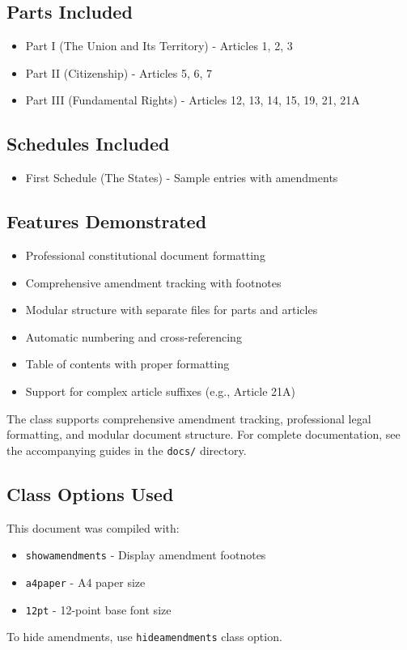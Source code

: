 \documentclass[a4paper,12pt,showamendments]{soi}
\begin{document}
\subsection*{Parts Included}
\begin{itemize}
\item Part I (The Union and Its Territory) - Articles 1, 2, 3
\item Part II (Citizenship) - Articles 5, 6, 7
\item Part III (Fundamental Rights) - Articles 12, 13, 14, 15, 19, 21, 21A
\end{itemize}

\subsection*{Schedules Included}
\begin{itemize}
\item First Schedule (The States) - Sample entries with amendments
\end{itemize}

\subsection*{Features Demonstrated}
\begin{itemize}
\item Professional constitutional document formatting
\item Comprehensive amendment tracking with footnotes
\item Modular structure with separate files for parts and articles
\item Automatic numbering and cross-referencing
\item Table of contents with proper formatting
\item Support for complex article suffixes (e.g., Article 21A)
\end{itemize}

The class supports comprehensive amendment tracking, professional legal formatting, and modular document structure. For complete documentation, see the accompanying guides in the \texttt{docs/} directory.

\subsection*{Class Options Used}
This document was compiled with:
\begin{itemize}
\item \texttt{showamendments} - Display amendment footnotes
\item \texttt{a4paper} - A4 paper size
\item \texttt{12pt} - 12-point base font size
\end{itemize}

To hide amendments, use \texttt{hideamendments} class option.
\end{document}
